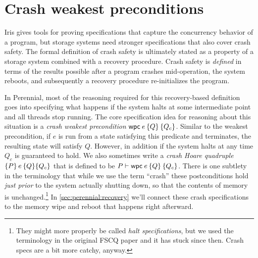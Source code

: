 \section{Crash weakest preconditions}
\label{sec:perennial:wpc}

\newcommand{\propc}{P_c}
\newcommand{\propcB}{Q_c}
\newcommand{\propcC}{R_c}

\newcommand{\wpcseqfig}{%
\begin{mathpar}
\inferH{wpc-value}
{}{\propc \land [\val/\var]\prop \proves \wpc{\val}{\Ret\var \prop}{\propc}}

\inferH{wpc-mono}
{\propc \proves \propcB \and \forall \val.\,\left([\val/\var]\prop \proves [\val/\var]\propB\right)}
{\wpc\expr{\Ret\var \prop}{\propc} \proves \wpc\expr{\Ret\var \propB}{\propcB}}


\inferH{wpc-frame}
{}{\propB * \wpc\expr{\prop}{\propc} \proves \wpc\expr{\propB*\prop}{\propB*\propc}}

\inferH{wp-wpc}
{}{\wpre\expr{\Ret\var \prop} \dashv\proves \wpc\expr{\Ret\var \prop}{\TRUE}}


\inferH{wpc-atomic}
{\atomic(\expr)}
{\propc \land \wpre\expr{\Ret\var  \propc \land \prop}
 \proves \wpc\expr{\Ret\var \prop}{\propc}}
\end{mathpar}
}

Iris gives tools for proving specifications that capture the concurrency
behavior of a program, but storage systems need stronger specifications that
also cover crash safety. The formal definition of crash safety is ultimately
stated as a property of a storage system combined with a recovery procedure.
Crash safety is \emph{defined} in terms of the results possible after a program
crashes mid-operation, the system reboots, and subsequently a recovery procedure
re-initializes the program.

In Perennial, most of the reasoning required for this recovery-based definition
goes into specifying what happens if the system halts at some intermediate point
and all threads stop running. The core specification idea for reasoning about
this situation is a \emph{crash weakest precondition} $\wpc{e}{Q}{Q_{c}}$. Similar
to the weakest precondition, if $e$ is run from a state satisfying this
predicate and terminates, the resulting state will satisfy $Q$. However, in
addition if the system halts at any time $Q_{c}$ is guaranteed to hold. We also
sometimes write a \emph{crash Hoare quadruple} $\hoareC{P}{e}{Q}{Q_{c}}$ that is
defined to be $P \proves \wpc{e}{Q}{Q_{c}}$. There is one subtlety in the
terminology that while we use the term ``crash'' these postconditions hold
\emph{just prior} to the system actually shutting down, so that the contents of
memory is unchanged.\footnote{They might more properly be called \emph{halt
specifications}, but we used the terminology in the original FSCQ paper and it has
stuck since then. Crash specs are a bit more catchy, anyway.} In \cref{sec:perennial:recovery} we'll connect these
crash specifications to the memory wipe and reboot that happens right afterward.

